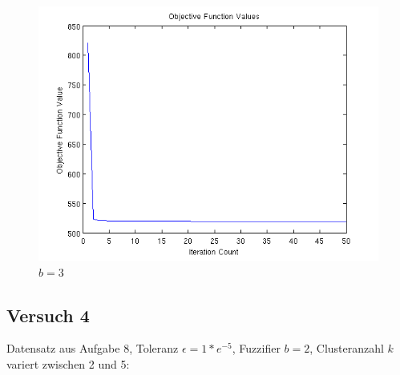 \begin{figure}[h]
    \centering
    \includegraphics[width=0.5\linewidth]{../img/data8b3e5c2.png}
    \caption{$b = 3$}
\end{figure}

\FloatBarrier
\subsection*{Versuch 4}
Datensatz aus Aufgabe 8, Toleranz $\epsilon = 1*e^{-5}$, Fuzzifier $b = 2$, Clusteranzahl $k$ variert zwischen 2 und 5:

